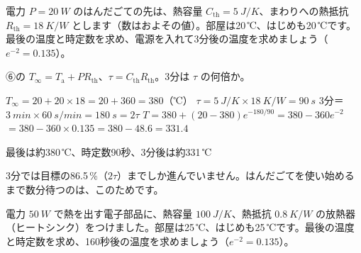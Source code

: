 \begin{reidai}
電力 $P=\qty{20}{W}$ のはんだごての先は、熱容量 $C_{\mathrm{th}}=\qty{5}{J/K}$、まわりへの熱抵抗 $R_{\mathrm{th}}=\qty{18}{K/W}$ とします（数はおよその値）。部屋は20\,℃、はじめも20\,℃です。最後の温度と時定数を求め、電源を入れて3分後の温度を求めましょう（$e^{-2}=0.135$）。\par
\kangaekata ⑥の $T_\infty=T_{\mathrm a}+PR_{\mathrm{th}}$、$\tau=C_{\mathrm{th}}R_{\mathrm{th}}$。3分は $\tau$ の何倍か。\par
\shiki $T_\infty=20+20\times18=20+360=380$（℃）\bkvieq
$\tau=\qty{5}{J/K}\times\qty{18}{K/W}=\qty{90}{s}$\bkvieq
3分＝$\qty{3}{min}\times\qty{60}{s/min}=\qty{180}{s}=2\tau$\bkvieq
$T=380+(20-380)e^{-180/90}=380-360e^{-2}$\bkvieq
$=380-360\times0.135=380-48.6=331.4$\par
\kotae 最後は約380\,℃、時定数90秒、3分後は約331\,℃
\end{reidai}
3分では目標の86.5\,\%（$2\tau$）までしか進んでいません。はんだごてを使い始めるまで数分待つのは、このためです。

\begin{jibun}
電力 $\qty{50}{W}$ で熱を出す電子部品に、熱容量 $\qty{100}{J/K}$、熱抵抗 $\qty{0.8}{K/W}$ の放熱器（ヒートシンク）をつけました。部屋は25\,℃、はじめも25\,℃です。最後の温度と時定数を求め、160秒後の温度を求めましょう（$e^{-2}=0.135$）。
\end{jibun}

